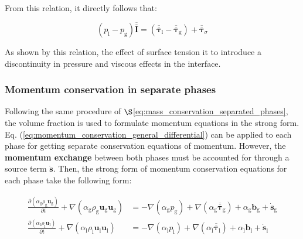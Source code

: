 From this relation, it directly follows that:

\begin{equation}
\boxed{
\left( p_\mathrm{l} - p_\mathrm{g} \right) \overline{\overline{\pmb{I}}} = \left( \overline{\overline{\pmb{\tau}}}_\mathrm{l} - \overline{\overline{\pmb{\tau}}}_\mathrm{g}  \right) + \overline{\overline{\pmb{\tau}}}_\sigma  
}
\end{equation}

As shown by this relation, the effect of surface tension it to introduce a discontinuity in pressure and viscous effects in the interface. 

\subsubsection*{Momentum conservation in separate phases}

Following the same procedure of $\S$\ref{eq:mass_conservation_separated_phases}, the volume fraction is used to formulate momentum equations in the strong form. Eq. (\ref{eq:momentum_conservation_general_differential}) can be applied to each phase for getting separate conservation equations of momentum. However, the \textbf{momentum exchange} between both phases must be accounted for through a source term $\dot{\boldsymbol{s}}$. Then, the strong form of momentum conservation equations for each phase take the following form:

\begin{subequations}
\begin{align}
\frac{\partial \left( \alpha_\mathrm{g} \rho_\mathrm{g} \boldsymbol{u}_\mathrm{g} \right) }{\partial t}  + \nabla \left( \alpha_\mathrm{g} \rho_\mathrm{g} \boldsymbol{u}_\mathrm{g}  \boldsymbol{u}_\mathrm{g} \right) &=  - \nabla \left( \alpha_\mathrm{g} p_\mathrm{g} \right) + \nabla \left( \alpha_\mathrm{g} \overline{\overline{\pmb{\tau}}}_\mathrm{g} \right) + \alpha_\mathrm{g} \boldsymbol{b}_\mathrm{g} + \dot{\boldsymbol{s}}_\mathrm{g} \\
\frac{\partial \left( \alpha_\mathrm{l} \rho_\mathrm{l} \boldsymbol{u}_\mathrm{l} \right) }{\partial t}  + \nabla \left( \alpha_\mathrm{l} \rho_\mathrm{l} \boldsymbol{u}_\mathrm{l}  \boldsymbol{u}_\mathrm{l} \right) &=  - \nabla \left( \alpha_\mathrm{l} p_\mathrm{l} \right) + \nabla \left( \alpha_\mathrm{l} \overline{\overline{\pmb{\tau}}}_\mathrm{l} \right) + \alpha_\mathrm{l} \boldsymbol{b}_\mathrm{l} + \dot{\boldsymbol{s}}_\mathrm{l}
\end{align}
\end{subequations}

